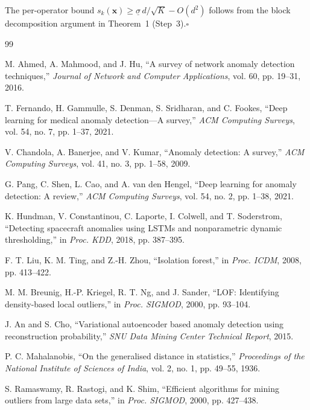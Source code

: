 \documentclass[journal]{IEEEtran}
\begin{document}
The per-operator bound $s_k(\mathbf{x})\geq\underline{\sigma}\,d/\sqrt{K}-O(d^2)$ follows from the block decomposition argument in Theorem~1 (Step~3).\hfill$\square$

\begin{thebibliography}{99}

M. Ahmed, A. Mahmood, and J. Hu, ``A survey of network anomaly detection techniques,'' \textit{Journal of Network and Computer Applications}, vol. 60, pp. 19--31, 2016.

T. Fernando, H. Gammulle, S. Denman, S. Sridharan, and C. Fookes, ``Deep learning for medical anomaly detection---A survey,'' \textit{ACM Computing Surveys}, vol. 54, no. 7, pp. 1--37, 2021.

V. Chandola, A. Banerjee, and V. Kumar, ``Anomaly detection: A survey,'' \textit{ACM Computing Surveys}, vol. 41, no. 3, pp. 1--58, 2009.

G. Pang, C. Shen, L. Cao, and A. van den Hengel, ``Deep learning for anomaly detection: A review,'' \textit{ACM Computing Surveys}, vol. 54, no. 2, pp. 1--38, 2021.

K. Hundman, V. Constantinou, C. Laporte, I. Colwell, and T. Soderstrom, ``Detecting spacecraft anomalies using LSTMs and nonparametric dynamic thresholding,'' in \textit{Proc. KDD}, 2018, pp. 387--395.

F. T. Liu, K. M. Ting, and Z.-H. Zhou, ``Isolation forest,'' in \textit{Proc. ICDM}, 2008, pp. 413--422.

M. M. Breunig, H.-P. Kriegel, R. T. Ng, and J. Sander, ``LOF: Identifying density-based local outliers,'' in \textit{Proc. SIGMOD}, 2000, pp. 93--104.

J. An and S. Cho, ``Variational autoencoder based anomaly detection using reconstruction probability,'' \textit{SNU Data Mining Center Technical Report}, 2015.

P. C. Mahalanobis, ``On the generalised distance in statistics,'' \textit{Proceedings of the National Institute of Sciences of India}, vol. 2, no. 1, pp. 49--55, 1936.

S. Ramaswamy, R. Rastogi, and K. Shim, ``Efficient algorithms for mining outliers from large data sets,'' in \textit{Proc. SIGMOD}, 2000, pp. 427--438.


\end{thebibliography}
\end{document}
